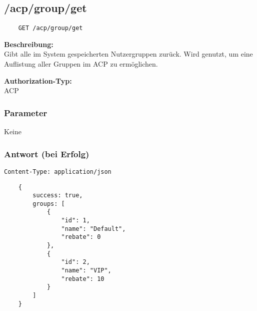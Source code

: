 \subsection{/acp/group/get}

\begin{lstlisting}
    GET /acp/group/get
\end{lstlisting}

\textbf{Beschreibung:} \\
Gibt alle im System gespeicherten Nutzergruppen zurück. Wird genutzt, um eine Auflistung aller Gruppen im ACP zu ermöglichen.

\textbf{Authorization-Typ:} \\
ACP

\subsubsection{Parameter}
Keine

\subsubsection{Antwort (bei Erfolg)}

\lstinline{Content-Type: application/json}
\begin{lstlisting}
    {
        success: true, 
        groups: [
            {
                "id": 1,
                "name": "Default",
                "rebate": 0
            },
            {
                "id": 2,
                "name": "VIP",
                "rebate": 10
            }
        ]
    }
\end{lstlisting}
